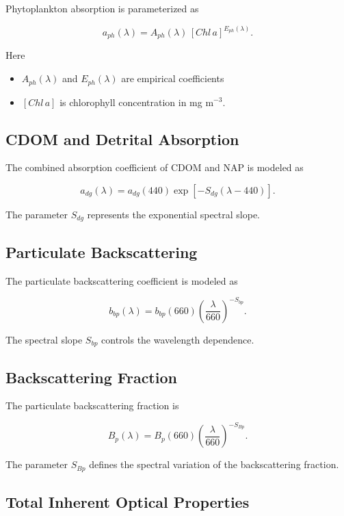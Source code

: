 \documentclass[
  11pt,
  letterpaper,
]{scrreprt}
\providecommand{\tightlist}{%
  \setlength{\itemsep}{0pt}\setlength{\parskip}{0pt}}
\begin{document}
Phytoplankton absorption is parameterized as

\[
a_{ph}(\lambda) = A_{ph}(\lambda)\,[Chl\,a]^{E_{ph}(\lambda)}.
\]

Here

\begin{itemize}
\tightlist
\item
  \(A_{ph}(\lambda)\) and \(E_{ph}(\lambda)\) are empirical coefficients
\item
  \([Chl\,a]\) is chlorophyll concentration in mg m\(^{-3}\).
\end{itemize}

\subsection{CDOM and Detrital
Absorption}\label{cdom-and-detrital-absorption}

The combined absorption coefficient of CDOM and NAP is modeled as

\[
a_{dg}(\lambda) =
a_{dg}(440)\exp\!\left[-S_{dg}(\lambda-440)\right].
\]

The parameter \(S_{dg}\) represents the exponential spectral slope.

\subsection{Particulate
Backscattering}\label{particulate-backscattering-1}

The particulate backscattering coefficient is modeled as

\[
b_{bp}(\lambda) =
b_{bp}(660)\left(\frac{\lambda}{660}\right)^{-S_{bp}}.
\]

The spectral slope \(S_{bp}\) controls the wavelength dependence.

\subsection{Backscattering Fraction}\label{backscattering-fraction-1}

The particulate backscattering fraction is

\[
B_p(\lambda) =
B_p(660)\left(\frac{\lambda}{660}\right)^{-S_{Bp}}.
\]

The parameter \(S_{Bp}\) defines the spectral variation of the
backscattering fraction.

\subsection{Total Inherent Optical
Properties}\label{total-inherent-optical-properties}
\end{document}

